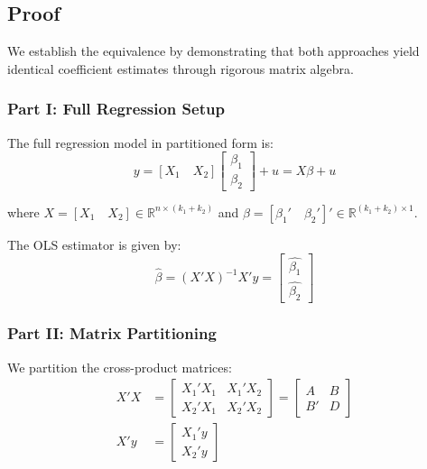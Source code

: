 \documentclass[11pt,letterpaper]{article}
\makeatletter
\theoremstyle{definition}
\newcommand{\R}{\mathbb{R}}
\renewenvironment{proof}[1][\proofname]{\par
  \pushQED{\qed}%
  \normalfont \topsep6\p@\@plus6\p@\relax
  \trivlist
  \item[\hskip\labelsep
        \itshape\bfseries\color{accentblue}
    #1\@addpunct{.}]\ignorespaces
}{%
  \popQED\endtrivlist\@endpefalse
}
\makeatother
\begin{document}
\subsection{Proof}

\begin{proof}
We establish the equivalence by demonstrating that both approaches yield identical coefficient estimates through rigorous matrix algebra.

\subsubsection*{\textcolor{primaryblue}{Part I: Full Regression Setup}}

The full regression model in partitioned form is:
\begin{equation}\label{eq:full_reg}
y = [X_1 \quad X_2]\begin{bmatrix} \beta_1 \\ \beta_2 \end{bmatrix} + u = X\beta + u
\end{equation}

where $X = [X_1 \quad X_2] \in \R^{n \times (k_1+k_2)}$ and $\beta = [\beta_1' \quad \beta_2']' \in \R^{(k_1+k_2) \times 1}$.

The OLS estimator is given by:
\begin{equation}\label{eq:ols}
\hat{\beta} = (X'X)^{-1}X'y = \begin{bmatrix} \hat{\beta_1} \\ \hat{\beta_2} \end{bmatrix}
\end{equation}

\subsubsection*{\textcolor{primaryblue}{Part II: Matrix Partitioning}}

We partition the cross-product matrices:
\begin{align}
X'X &= \begin{bmatrix} X_1'X_1 & X_1'X_2 \\ X_2'X_1 & X_2'X_2 \end{bmatrix} = \begin{bmatrix} A & B \\ B' & D \end{bmatrix} \label{eq:XtX}\\
X'y &= \begin{bmatrix} X_1'y \\ X_2'y \end{bmatrix} \label{eq:Xty}
\end{align}


\end{proof}
\end{document}
